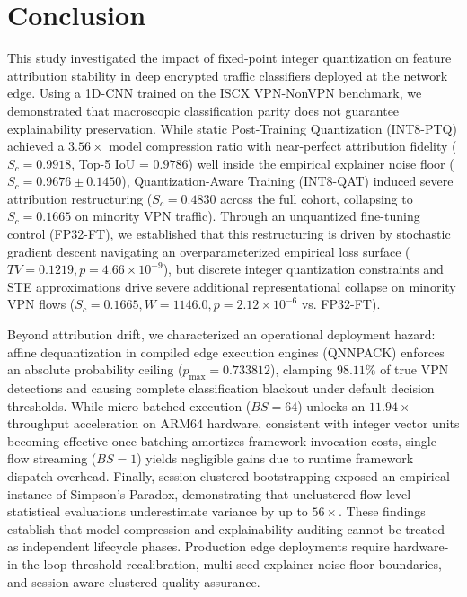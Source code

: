 \documentclass[conference]{IEEEtran}
\begin{document}
\section{Conclusion}
This study investigated the impact of fixed-point integer quantization on feature attribution stability in deep encrypted traffic classifiers deployed at the network edge. Using a 1D-CNN trained on the ISCX VPN-NonVPN benchmark, we demonstrated that macroscopic classification parity does not guarantee explainability preservation. While static Post-Training Quantization (INT8-PTQ) achieved a $3.56\times$ model compression ratio with near-perfect attribution fidelity ($S_c = 0.9918$, Top-5 IoU = $0.9786$) well inside the empirical explainer noise floor ($S_c = 0.9676 \pm 0.1450$), Quantization-Aware Training (INT8-QAT) induced severe attribution restructuring ($S_c = 0.4830$ across the full cohort, collapsing to $S_c = 0.1665$ on minority VPN traffic). Through an unquantized fine-tuning control (FP32-FT), we established that this restructuring is driven by stochastic gradient descent navigating an overparameterized empirical loss surface ($TV = 0.1219, p = 4.66 \times 10^{-9}$), but discrete integer quantization constraints and STE approximations drive severe additional representational collapse on minority VPN flows ($S_c = 0.1665, W = 1146.0, p = 2.12 \times 10^{-6}$ vs. FP32-FT).

Beyond attribution drift, we characterized an operational deployment hazard: affine dequantization in compiled edge execution engines (QNNPACK) enforces an absolute probability ceiling ($p_{\max} = 0.733812$), clamping $98.11\%$ of true VPN detections and causing complete classification blackout under default decision thresholds. While micro-batched execution ($BS=64$) unlocks an $11.94\times$ throughput acceleration on ARM64 hardware, consistent with integer vector units becoming effective once batching amortizes framework invocation costs, single-flow streaming ($BS=1$) yields negligible gains due to runtime framework dispatch overhead. Finally, session-clustered bootstrapping exposed an empirical instance of Simpson's Paradox, demonstrating that unclustered flow-level statistical evaluations underestimate variance by up to $56\times$. These findings establish that model compression and explainability auditing cannot be treated as independent lifecycle phases. Production edge deployments require hardware-in-the-loop threshold recalibration, multi-seed explainer noise floor boundaries, and session-aware clustered quality assurance.
\end{document}
